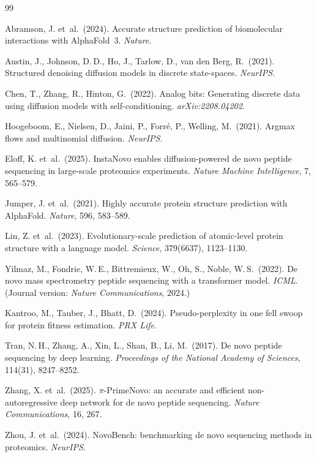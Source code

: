 \documentclass[10pt,twocolumn]{article}
\begin{document}

{\sloppy
\begin{thebibliography}{99}

Abramson, J. et~al.\ (2024).
Accurate structure prediction of biomolecular interactions with AlphaFold~3.
\textit{Nature}.

Austin, J., Johnson, D.\,D., Ho, J., Tarlow, D., van den Berg, R.\ (2021).
Structured denoising diffusion models in discrete state-spaces.
\textit{NeurIPS}.

Chen, T., Zhang, R., Hinton, G.\ (2022).
Analog bits: Generating discrete data using diffusion models with self-conditioning.
\textit{arXiv:2208.04202}.

Hoogeboom, E., Nielsen, D., Jaini, P., Forré, P., Welling, M.\ (2021).
Argmax flows and multinomial diffusion.
\textit{NeurIPS}.

Eloff, K. et~al.\ (2025).
InstaNovo enables diffusion-powered de novo peptide sequencing in large-scale
proteomics experiments.
\textit{Nature Machine Intelligence}, 7, 565--579.

Jumper, J. et~al.\ (2021).
Highly accurate protein structure prediction with AlphaFold.
\textit{Nature}, 596, 583--589.

Lin, Z. et~al.\ (2023).
Evolutionary-scale prediction of atomic-level protein structure with a language model.
\textit{Science}, 379(6637), 1123--1130.

Yilmaz, M., Fondrie, W.\,E., Bittremieux, W., Oh, S., Noble, W.\,S.\ (2022).
De novo mass spectrometry peptide sequencing with a transformer model.
\textit{ICML}. (Journal version: \textit{Nature Communications}, 2024.)

Kantroo, M., Tauber, J., Bhatt, D.\ (2024).
Pseudo-perplexity in one fell swoop for protein fitness estimation.
\textit{PRX Life}.

Tran, N.\,H., Zhang, A., Xin, L., Shan, B., Li, M.\ (2017).
De novo peptide sequencing by deep learning.
\textit{Proceedings of the National Academy of Sciences}, 114(31), 8247--8252.

Zhang, X. et~al.\ (2025).
$\pi$-PrimeNovo: an accurate and efficient non-autoregressive deep network
for de novo peptide sequencing.
\textit{Nature Communications}, 16, 267.

Zhou, J. et~al.\ (2024).
NovoBench: benchmarking de novo sequencing methods in proteomics.
\textit{NeurIPS}.

\end{thebibliography}
}
\end{document}
